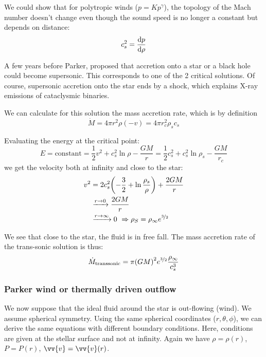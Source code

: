 \documentclass[10pt,a4paper,english]{article}
\let\originalleft\left
\let\originalright\right
\renewcommand{\left}{\mathopen{}\mathclose\bgroup\originalleft}
\renewcommand{\right}{\aftergroup\egroup\originalright}
\begin{document}
We could show that for polytropic winds ($p = Kp^\gamma$), the topology of the
Mach number doesn't change even though the sound speed is no longer a constant
but depends on distance:
\begin{equation}
    c_s^2 = \frac{\mathrm{d} p}{\mathrm{d} \rho}
\end{equation}

A few years before Parker, \cite{1952MNRAS.112..195B} proposed that accretion
onto a star or a black hole could become supersonic. This corresponds to one of
the 2 critical solutions. Of course, supersonic accretion onto the star ends by
a shock, which explains X-ray emissions of cataclysmic binaries.

We can calculate for this solution the mass accretion rate, which is by
definition
\begin{equation}
    \dot{M} = 4\pi r^2 \rho (-v) = 4\pi r_c^2 \rho_s c_s
\end{equation}

Evaluating the energy at the critical point:
\begin{equation}
    E = \textrm{constant} = \frac{1}{2}v^2 + c_s^2 \ln\rho - \frac{GM}{r} = \frac{1}{2}c_s^2 + c_s^2 \ln \rho_s - \frac{GM}{r_c}
\end{equation}
we get the velocity both at infinity and close to the star:
\begin{align}
    v^2 &= 2c_s^2 \left( -\frac{3}{2} + \ln \frac{\rho_s}{\rho} \right)  + \frac{2GM}{r} \\
        & \xrightarrow{r\to 0} \frac{2GM}{r} \\
        & \xrightarrow{r\to\infty} 0\ \Rightarrow \rho_S = \rho_\infty e^{\nicefrac{3}{2}}
\end{align}

We see that close to the star, the fluid is in free fall. The mass accretion
rate of the trans-sonic solution is thus:
\begin{equation}
    \dot{M}_\mathrm{transsonic} = \pi \left( GM \right)^2 e^{\nicefrac{3}{2}} \frac{\rho_\infty}{c_s^3}
\end{equation}

\subsubsection{Parker wind or thermally driven outflow}

We now suppose that the ideal fluid around the star is out-flowing (wind). We
assume spherical symmetry. Using the same spherical coordinates ($r, \theta,
\phi$), we can derive the same equations with different boundary conditions.
Here, conditions are given at the stellar surface and not at infinity. Again we
have $\rho = \rho(r)$, $P = P(r)$, $\vv{v} = \vv{v}(r)$.
\end{document}
